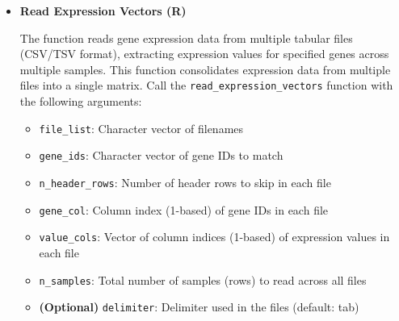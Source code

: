 \begin{enumerate}
\begin{itemize}
\begin{itemize}
                    \item \textbf{ierr}: Integer error code (0 if successful)
                  \end{itemize}
                  
                  \begin{lstlisting}[language=R, caption={R Read Gene IDs from TSV File}]
read_gene_ids_from_tsv_file(filename, ngenes, gene_len, 
    n_header_rows = 1, gene_col = 1)
                  \end{lstlisting}
                  
            \item \textbf{Read Expression Vectors (R)}
                  
                  The function reads gene expression data from multiple tabular files (CSV/TSV
                  format), extracting expression values for specified genes across multiple
                  samples. This function consolidates expression data from multiple files into
                  a single matrix. Call the \texttt{read\_expression\_vectors} function with
                  the following arguments:
                  
                  \begin{itemize}
                    \item \texttt{file\_list}: Character vector of filenames
                          
                    \item \texttt{gene\_ids}: Character vector of gene IDs to match
                          
                    \item \texttt{n\_header\_rows}: Number of header rows to skip in each file
                          
                    \item \texttt{gene\_col}: Column index (1-based) of gene IDs in each file
                          
                    \item \texttt{value\_cols}: Vector of column indices (1-based) of expression
                          values in each file
                          
                    \item \texttt{n\_samples}: Total number of samples (rows) to read across
                          all files
                          
                    \item \textbf{(Optional)} \texttt{delimiter}: Delimiter used in the
                          files (default: tab)
                  \end{itemize}
                  

\end{itemize}
\end{enumerate}
